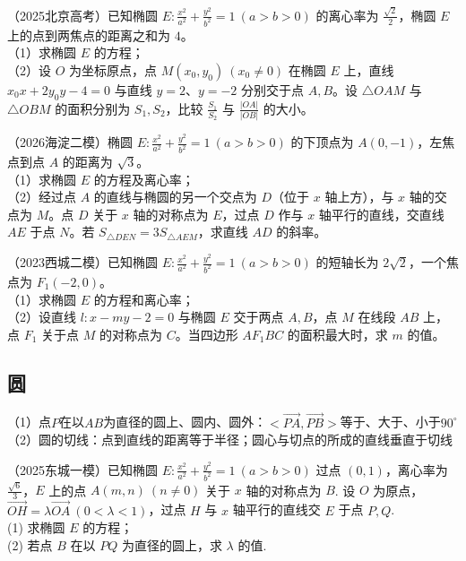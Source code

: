 \begin{example}
（2025北京高考）已知椭圆 $E:\frac{x^2}{a^2}+\frac{y^2}{b^2}=1\ (a>b>0)$ 的离心率为 $\frac{\sqrt{2}}{2}$，椭圆 $E$ 上的点到两焦点的距离之和为 $4$。\\
（1）求椭圆 $E$ 的方程；\\
（2）设 $O$ 为坐标原点，点 $M(x_0,y_0)\ (x_0\neq0)$ 在椭圆 $E$ 上，直线 $x_0x+2y_0y-4=0$ 与直线 $y=2$、$y=-2$ 分别交于点 $A,B$。设 $\triangle OAM$ 与 $\triangle OBM$ 的面积分别为 $S_1,S_2$，比较 $\frac{S_1}{S_2}$ 与 $\frac{\lvert OA\rvert}{\lvert OB\rvert}$ 的大小。
\end{example}


\begin{example}
（2026海淀二模）椭圆 $E:\frac{x^2}{a^2}+\frac{y^2}{b^2}=1\ (a>b>0)$ 的下顶点为 $A(0,-1)$，左焦点到点 $A$ 的距离为 $\sqrt{3}$。\\
（1）求椭圆 $E$ 的方程及离心率；\\
（2）经过点 $A$ 的直线与椭圆的另一个交点为 $D$（位于 $x$ 轴上方），与 $x$ 轴的交点为 $M$。点 $D$ 关于 $x$ 轴的对称点为 $E$，过点 $D$ 作与 $x$ 轴平行的直线，交直线 $AE$ 于点 $N$。若
$S_{\triangle DEN}=3S_{\triangle AEM}$，求直线 $AD$ 的斜率。
\end{example}

\begin{example} %
（2023西城二模）已知椭圆 $E:\frac{x^2}{a^2}+\frac{y^2}{b^2}=1\ (a>b>0)$ 的短轴长为 $2\sqrt{2}$，一个焦点为 $F_1(-2,0)$。\\
（1）求椭圆 $E$ 的方程和离心率；\\
（2）设直线 $l:x-my-2=0$ 与椭圆 $E$ 交于两点 $A,B$，点 $M$ 在线段 $AB$ 上，点 $F_1$ 关于点 $M$ 的对称点为 $C$。当四边形 $AF_1BC$ 的面积最大时，求 $m$ 的值。
\end{example}





\subsection{圆}
\noindent（1）点$P$在以$AB$为直径的圆上、圆内、圆外：$ <\overrightarrow{PA}, \overrightarrow{PB}>$等于、大于、小于$90^\circ$ \\
（2）圆的切线：点到直线的距离等于半径；圆心与切点的所成的直线垂直于切线




\begin{example} %
（2025东城一模）已知椭圆 $E:\frac{x^{2}}{a^{2}}+\frac{y^{2}}{b^{2}}=1\ (a>b>0)$ 过点 $(0,1)$，离心率为 $\frac{\sqrt{6}}{3}$，$E$ 上的点 $A(m,n)\ (n\neq0)$ 关于 $x$ 轴的对称点为 $B$. 设 $O$ 为原点，$\overrightarrow{OH}=\lambda\overrightarrow{OA}\ (0<\lambda<1)$，过点 $H$ 与 $x$ 轴平行的直线交 $E$ 于点 $P,Q$.\\
(1) 求椭圆 $E$ 的方程；\\
(2) 若点 $B$ 在以 $PQ$ 为直径的圆上，求 $\lambda$ 的值.
\end{example}


